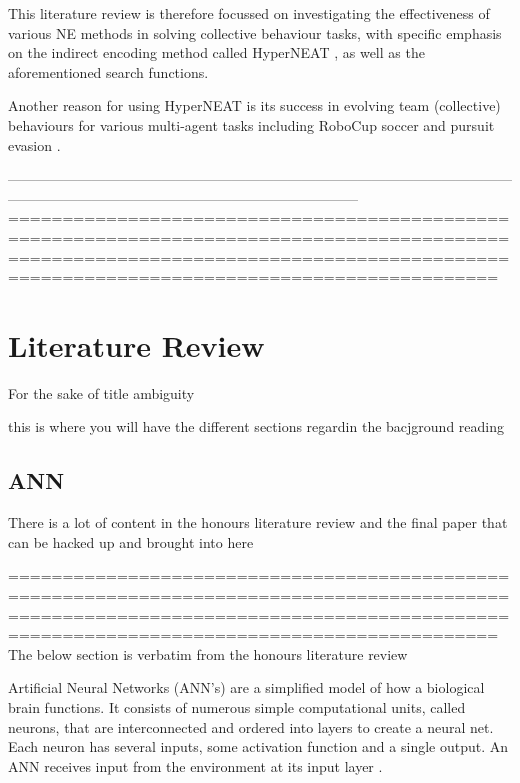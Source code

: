 \documentclass[conference]{IEEEtran}
\begin{document}
This literature review is therefore focussed on investigating the effectiveness of various NE methods in solving collective behaviour tasks, with specific emphasis on the indirect encoding method called HyperNEAT \cite{stanley2009hypercube}, as well as the aforementioned search functions.


Another reason for using HyperNEAT is its success in evolving team (collective) behaviours for various multi-agent tasks including RoboCup soccer and pursuit evasion \cite{hausknecht2012hyperneat}.

---------------------------------------------------------------------------------------------------------------------------------------------------------------------------------------
=======================================================================================================================================================================================









\section{Literature Review}

For the sake of title ambiguity

this is where you will have the different sections regardin the bacjground reading

\subsection{ANN}

There is a lot of content in the honours literature review and the final paper that can be hacked up and brought into here

=======================================================================================================================================================================================
The below section is verbatim from the honours literature review

Artificial Neural Networks (ANN's) are a simplified model of how a biological brain functions\cite{mcculloch1943logical}. It consists of numerous simple computational units, called neurons, that are interconnected and ordered into layers to create a neural net\cite{RefWorks:31}. Each neuron has several inputs, some activation function and a single output. An ANN receives input from the environment at its input layer \cite{RefWorks:32}.
\end{document}
